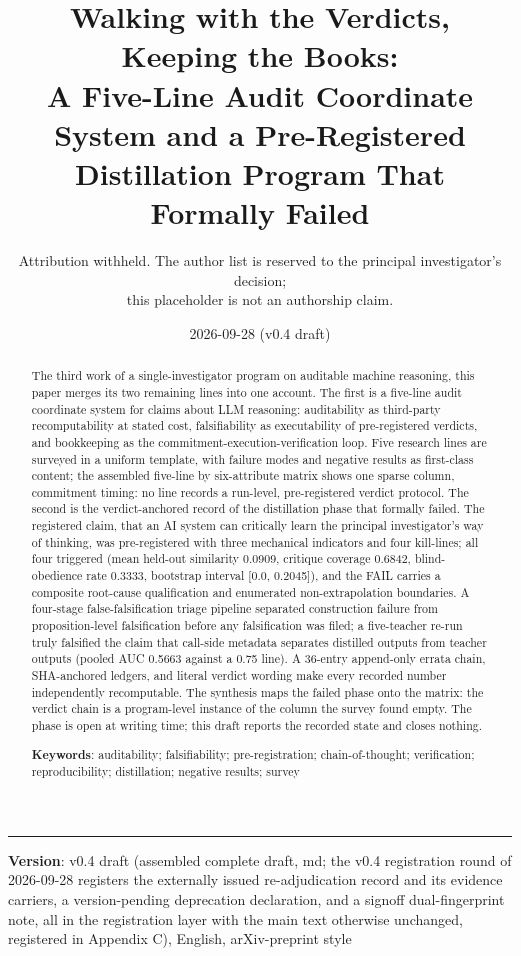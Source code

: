 \documentclass[11pt]{article}
\title{\bfseries Walking with the Verdicts, Keeping the Books:\\ A Five-Line Audit Coordinate System and a Pre-Registered\\ Distillation Program That Formally Failed}
\author{Attribution withheld. The author list is reserved to the principal investigator's decision;\\ this placeholder is not an authorship claim.}
\date{2026-09-28 (v0.4 draft)}
\begin{document}
\maketitle
\thispagestyle{empty}

\begin{abstract}
The third work of a single-investigator program on auditable machine reasoning, this paper merges its two remaining lines into one account. The first is a five-line audit coordinate system for claims about LLM reasoning: auditability as third-party recomputability at stated cost, falsifiability as executability of pre-registered verdicts, and bookkeeping as the commitment-execution-verification loop. Five research lines are surveyed in a uniform template, with failure modes and negative results as first-class content; the assembled five-line by six-attribute matrix shows one sparse column, commitment timing: no line records a run-level, pre-registered verdict protocol. The second is the verdict-anchored record of the distillation phase that formally failed. The registered claim, that an AI system can critically learn the principal investigator's way of thinking, was pre-registered with three mechanical indicators and four kill-lines; all four triggered (mean held-out similarity 0.0909, critique coverage 0.6842, blind-obedience rate 0.3333, bootstrap interval [0.0, 0.2045]), and the FAIL carries a composite root-cause qualification and enumerated non-extrapolation boundaries. A four-stage false-falsification triage pipeline separated construction failure from proposition-level falsification before any falsification was filed; a five-teacher re-run truly falsified the claim that call-side metadata separates distilled outputs from teacher outputs (pooled AUC 0.5663 against a 0.75 line). A 36-entry append-only errata chain, SHA-anchored ledgers, and literal verdict wording make every recorded number independently recomputable. The synthesis maps the failed phase onto the matrix: the verdict chain is a program-level instance of the column the survey found empty. The phase is open at writing time; this draft reports the recorded state and closes nothing.

\medskip\noindent\textbf{Keywords}: auditability; falsifiability; pre-registration; chain-of-thought; verification; reproducibility; distillation; negative results; survey
\end{abstract}
\vspace{0.5em}\hrule\vspace{0.8em}
\noindent \textbf{Version}: v0.4 draft (assembled complete draft, md; the v0.4 registration round of 2026-09-28 registers the externally issued re-adjudication record and its evidence carriers, a version-pending deprecation declaration, and a signoff dual-fingerprint note, all in the registration layer with the main text otherwise unchanged, registered in Appendix C), English, arXiv-preprint style\par\smallskip
\end{document}
